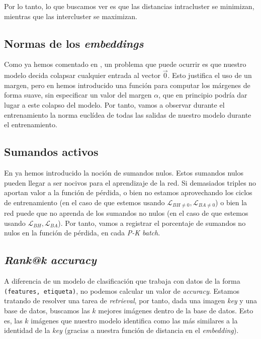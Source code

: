 Por lo tanto, lo que buscamos ver es que las distancias intracluster se minimizan, mientras que las intercluster se maximizan.

\subsection{Normas de los \textit{embeddings}}

Como ya hemos comentado en , un problema que puede ocurrir es que nuestro modelo decida colapsar cualquier entrada al vector $\vec{0}$. Esto justifica el uso de un margen, pero en  hemos introducido una función para computar los márgenes de forma suave, sin especificar un valor del margen $\alpha$, que en principio podría dar lugar a este colapso del modelo. Por tanto, vamos a observar durante el entrenamiento la norma euclídea de todas las salidas de nuestro modelo durante el entrenamiento.

\subsection{Sumandos activos}

En  ya hemos introducido la noción de sumandos nulos. Estos sumandos nulos pueden llegar a ser nocivos para el aprendizaje de la red. Si demasiados triples no aportan valor a la función de pérdida, o bien no estamos aprovechando los ciclos de entrenamiento (en el caso de que estemos usando $\mathcal{L}_{BH \neq 0}, \mathcal{L}_{BA \neq 0}$) o bien  la red puede que no aprenda de los sumandos no nulos (en el caso de que estemos usando $\mathcal{L}_{BH}, \mathcal{L}_{BA}$). Por tanto, vamos a registrar el porcentaje de sumandos no nulos en la función de pérdida, en cada \textit{P-K batch}.

\subsection{\textit{Rank@k accuracy}} \label{isubs:rank_at_k}

A diferencia de un modelo de clasificación que trabaja con datos de la forma \lstinline{(features, etiqueta)}, no podemos calcular un valor de \textit{accuracy}. Estamos tratando de resolver una tarea de \textit{retrieval}, por tanto, dada una imagen \textit{key} y una base de datos, buscamos las $k$  mejores imágenes dentro de la base de datos. Esto es, las $k$ imágenes que nuestro modelo identifica como las más similares a la identidad de la \textit{key} (gracias a nuestra función de distancia en el \textit{embedding}).

